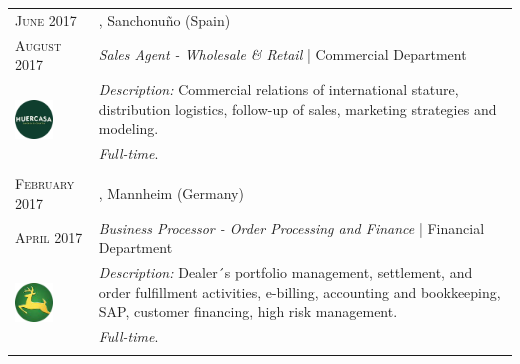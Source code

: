 %
%
\vspace{3 mm}



\begin{longtable}{R{2.5cm}|p{14.8cm}}

 	\textsc{June 2017} & \textsc{}, \faMapMarker \hspace{0.5 mm} Sanchonuño (Spain) \\
 	\textsc{August 2017} 	& \textit{Sales Agent - Wholesale \& Retail} | Commercial Department \\
	 & 
	\footnotesize{\faTasks \emph{ Description: }Commercial relations of international stature, distribution logistics, follow-up of sales, marketing strategies and modeling.} \\ &
	\footnotesize{\faFileText \emph{ Full-time}.} \\
 	 \\
 
 	\textsc{February 2017} & \textsc{}, \faMapMarker \hspace{0.5 mm} Mannheim (Germany) \\
 	\textsc{April 2017} 	& \textit{Business Processor - Order Processing and Finance} | Financial Department \\
	 & 
 	\footnotesize{\faTasks \emph{ Description: }Dealer´s portfolio management, settlement, and order fulfillment activities, e-billing, accounting and bookkeeping, SAP, customer financing, high risk management.} \\ &
	\footnotesize{\faFileText \emph{ Full-time}}. \\
 	 \\
	

\end{longtable}
